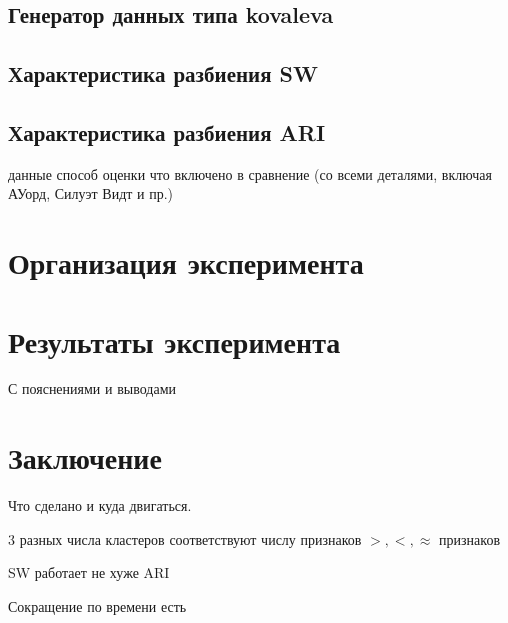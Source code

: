 \documentclass[12pt]{a&t}
\begin{document}
\subsection{Генератор данных типа kovaleva}\label{sec:data-generation}
\subsection{Характеристика разбиения SW}\label{sec:sw}
\subsection{Характеристика разбиения ARI}\label{sec:ari}

данные 
способ оценки
что включено в сравнение
(со всеми деталями, включая АУорд, Силуэт Видт и пр.)


\section{Организация эксперимента}

\section{Результаты эксперимента}
С пояснениями и выводами

\section{Заключение}

Что сделано и куда двигаться.
\begin{enumlist} %
	\item
	3 разных числа кластеров соответствуют числу признаков $ >,<,\approx $ признаков	
	\item
	SW работает не хуже ARI
	\item
	Сокращение по времени есть
\end{enumlist}
\end{document}

